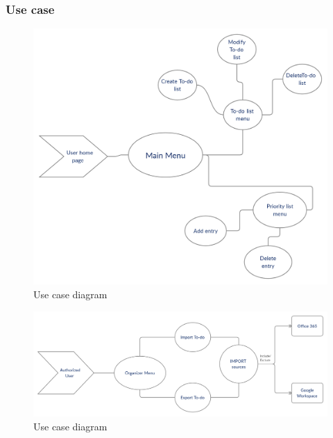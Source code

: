 \subsubsection{Use case}
\par
\begin{figure}[h]
	\includegraphics[width=\textwidth]{diagramusecase1}
	\caption{Use case diagram}
\end{figure}
\par 

\par
\begin{figure}[h]
	\includegraphics[width=\textwidth]{diagramusecase2}
	\caption{Use case diagram}
\end{figure}
